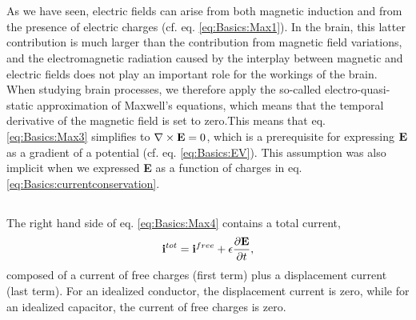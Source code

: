 \section{}

\subsection{}
\label{sec:Basics:Quasielectrostatic} 
As we have seen, electric fields can arise from both magnetic induction and from the presence of electric charges (cf. eq. \ref{eq:Basics:Max1}). In the brain, this latter contribution is much larger than the contribution from magnetic field variations, and the electromagnetic radiation caused by the interplay between magnetic and electric fields does not play an important role for the workings of the brain. When studying brain processes, we therefore apply the so-called electro-quasi-static approximation of Maxwell's equations, which means that the temporal derivative of the magnetic field is set to zero.This means that eq. \ref{eq:Basics:Max3} simplifies to $\nabla \times {\bf E} = 0$, which is a prerequisite for expressing ${\bf E}$ as a gradient of a potential (cf. eq. \ref{eq:Basics:EV}). This assumption was also implicit when we expressed {\bf E} as a function of charges in eq. \ref{eq:Basics:currentconservation}. 


\subsection{}
\label{sec:Basics:Quasimagnetostatic} 
The right hand side of eq. \ref{eq:Basics:Max4} contains a total current,
\begin{equation}
{\bf i}^{tot} = {\bf i}^{free} + \epsilon\frac{\partial {\bf E}}{\partial t}, 
\label{eq:Basics:totcurrent}
\end{equation}
composed of a current of free charges (first term) plus a displacement current (last term). For an idealized conductor, the displacement current is zero, while for an idealized capacitor, the current of free charges is zero. 

